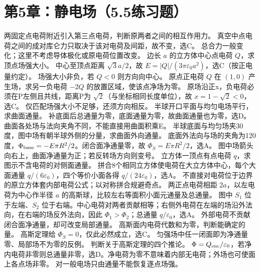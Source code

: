 \section{第5章：静电场（5.5练习题）}
\problemtext 两固定点电荷附近引入第三点电荷，判断原两者之间的相互作用力。
\workings 真空中点电荷之间的成对库仑力只取决于该对电荷及间距，故不变，选C。
\crosscheck 总合力一般变化；这里不考虑导体极化或原电荷位置改变。
\problemtext 边长 $a$ 的立方体中心点电荷 $Q$，求顶点场强大小。
\workings 中心至顶点距离 $\sqrt3a/2$，故 $E=|Q|/(3\pi\varepsilon_0a^2)$，选C（按正电量约定）。
\crosscheck 场强大小非负，若 $Q<0$ 则方向向中心。
\problemtext 原点正电荷 $Q$ 在 $(1,0)$ 产生场，求另一负电荷 $-2Q$ 的放置区域，使该点净场为零。
\workings 原场沿正x，负电荷必须在P左侧且共线，距离P为 $\sqrt2$（与坐标相同长度单位），故 $x=1-\sqrt2<0$，选C。
\crosscheck 仅匹配场强大小不足够，还须方向相反。
\problemtext 半球开口平面与均匀电场平行，求曲面通量。
\workings 补底面后总通量为零，底面通量为零，故曲面通量也为零，选D。
\crosscheck 曲面各处场与法向夹角不同，不能直接用曲面积乘E。
\problemtext 半球底面与均匀场夹30度，图中场有朝半球外侧的分量，求曲面外向通量。
\workings 底面外法向与场的夹角为120度，$\Phi_{\rm base}=-E\pi R^2/2$。闭合面净通量零，故 $\Phi_S=E\pi R^2/2$，选A。
\crosscheck 图中场箭头向右上，曲面净通量为正；若反转场方向则变号。
\problemtext 立方体一顶点有点电荷 $q$，求图示不含电荷的对侧面通量。
\workings 拼合8个相同立方体使电荷在大立方体中心，每个大面通量 $q/(6\varepsilon_0)$，四个等价小面各得 $q/(24\varepsilon_0)$，选A。
\crosscheck 不直接对电荷位于边界的原立方体套内部电荷公式；以对称拼合规避奇点。
\problemtext 两正点电荷相距 $2a$，以左电荷为中心作半径 $a$ 的高斯球，比较左右等面积小面元通量及总通量。
\workings 图中 $S_1$ 位于左端、$S_2$ 位于右端。中心电荷对两者贡献相等；右侧外电荷在左端的场沿外法向，在右端的场反外法向，因此 $\Phi_1>\Phi_2$；总通量 $q/\varepsilon_0$，选A。
\crosscheck 外部电荷不贡献闭合面净通量，却可改变局部通量。
\problemtext 高斯面内电荷代数和为零，判断能确定的量。
\workings 高斯定理给 $\Phi_S=0$，仅此必然成立，选C。
\crosscheck 匀强场中任一闭面即为净通量零、局部场不为零的反例。
\problemtext 判断关于高斯定理的四个推论。
\workings $\Phi=Q_{\rm enc}/\varepsilon_0$，若净内电荷非零则总通量非零，选D。净电荷为零不意味着内部无电荷；外场也可使面上各点场非零。
\crosscheck 对一般电场只由通量不能恢复逐点场强。
